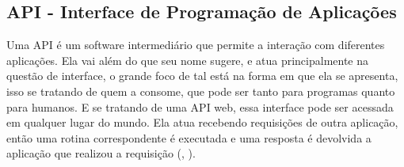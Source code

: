 \subsection{API - Interface de Programação de Aplicações}
Uma API é um software intermediário que permite a interação com diferentes aplicações. Ela vai além do que seu nome sugere, e atua principalmente na questão de interface, o grande foco de tal está na forma em que ela se apresenta, isso se tratando de quem a consome, que pode ser tanto para programas quanto para humanos. E se tratando de uma API web, essa interface pode ser acessada em qualquer lugar do mundo. Ela atua recebendo requisições de outra aplicação, então uma rotina correspondente é executada e uma resposta é devolvida a aplicação que realizou a requisição (\citeauthor{designingapioriley}, \citeyear{designingapioriley}).

